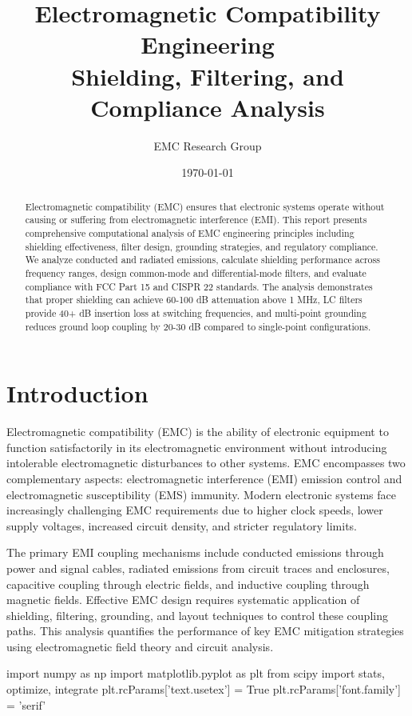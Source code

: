 \documentclass[11pt,a4paper]{article}
\title{Electromagnetic Compatibility Engineering\\Shielding, Filtering, and Compliance Analysis}
\author{EMC Research Group}
\date{\today}
\begin{document}
\maketitle

\begin{abstract}
Electromagnetic compatibility (EMC) ensures that electronic systems operate without causing or suffering from electromagnetic interference (EMI). This report presents comprehensive computational analysis of EMC engineering principles including shielding effectiveness, filter design, grounding strategies, and regulatory compliance. We analyze conducted and radiated emissions, calculate shielding performance across frequency ranges, design common-mode and differential-mode filters, and evaluate compliance with FCC Part 15 and CISPR 22 standards. The analysis demonstrates that proper shielding can achieve 60-100 dB attenuation above 1 MHz, LC filters provide 40+ dB insertion loss at switching frequencies, and multi-point grounding reduces ground loop coupling by 20-30 dB compared to single-point configurations.
\end{abstract}

\section{Introduction}

Electromagnetic compatibility (EMC) is the ability of electronic equipment to function satisfactorily in its electromagnetic environment without introducing intolerable electromagnetic disturbances to other systems. EMC encompasses two complementary aspects: electromagnetic interference (EMI) emission control and electromagnetic susceptibility (EMS) immunity. Modern electronic systems face increasingly challenging EMC requirements due to higher clock speeds, lower supply voltages, increased circuit density, and stricter regulatory limits.

The primary EMI coupling mechanisms include conducted emissions through power and signal cables, radiated emissions from circuit traces and enclosures, capacitive coupling through electric fields, and inductive coupling through magnetic fields. Effective EMC design requires systematic application of shielding, filtering, grounding, and layout techniques to control these coupling paths. This analysis quantifies the performance of key EMC mitigation strategies using electromagnetic field theory and circuit analysis.

\begin{pycode}

import numpy as np
import matplotlib.pyplot as plt
from scipy import stats, optimize, integrate
plt.rcParams['text.usetex'] = True
plt.rcParams['font.family'] = 'serif'

\end{pycode}
\end{document}
